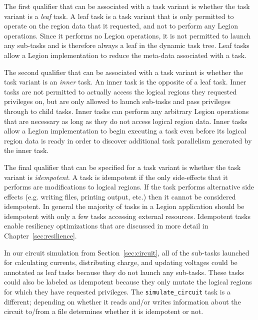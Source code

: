 The first qualifier that can be associated with
a task variant is whether the task variant
is a {\em leaf} task. A leaf task is a task 
variant that is only permitted to operate on 
the region data that it requested, and not to 
perform any Legion operations. Since it performs 
no Legion operations, it is not permitted to 
launch any sub-tasks and is therefore always a 
leaf in the dynamic task tree. 
Leaf tasks allow a Legion implementation
to reduce the meta-data associated with a task.

The second qualifier that can be associated with
a task variant is whether the task variant is
an {\em inner} task. An inner task is the opposite
of a leaf task. Inner tasks are not permitted to
actually access the logical regions they requested
privileges on, but are only allowed to launch
sub-tasks and pass privileges through to child
tasks. Inner tasks can perform any arbitrary
Legion operations that are necessary as long
as they do not access logical region data. Inner
tasks allow a Legion implementation to begin
executing a task even before its logical region
data is ready in order to discover additional task
parallelism generated by the inner task.

The final qualifier that can be specified for
a task variant is whether the task variant
is {\em idempotent}. A task is idempotent if
the only side-effects that it performs are
modifications to logical regions. If the task
performs alternative side effects (e.g.
writing files, printing output, etc.) then 
it cannot be considered
idempotent. In general the majority of tasks
in a Legion application should be idempotent
with only a few tasks accessing external 
resources. Idempotent tasks enable 
resiliency optimizations that are discussed
in more detail in Chapter~\ref{sec:resilience}.

In our circuit simulation from Section~\ref{sec:circuit},
all of the sub-tasks launched for calculating
currents, distributing charge, and updating voltages
could be annotated as leaf tasks because they
do not launch any sub-tasks. These tasks could also
be labeled as idempotent because they only mutate
the logical regions for which they have requested
privileges. The {\tt simulate\_circuit} task is a
different; depending on whether it reads and/or
writes information about the circuit to/from a 
file determines whether it is idempotent or not.


